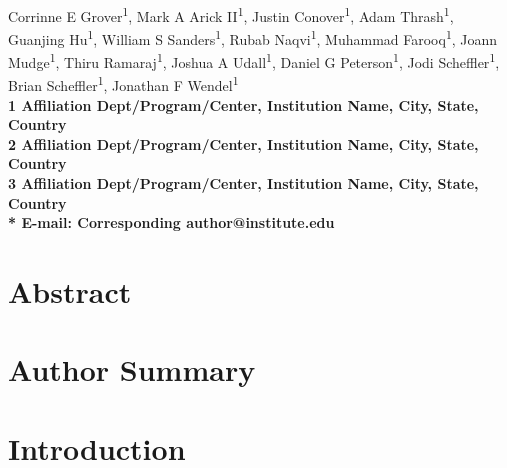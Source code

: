 \documentclass[10pt,letterpaper]{article}
\date{}
\begin{document}
\vspace*{0.35in}

\begin{flushleft}
{\Large
\textbf{}
}
\newline
\\
Corrinne E Grover\textsuperscript{1},
Mark A Arick II\textsuperscript{1},
Justin Conover\textsuperscript{1},
Adam Thrash\textsuperscript{1},
Guanjing Hu\textsuperscript{1},
William S Sanders\textsuperscript{1},
Rubab Naqvi\textsuperscript{1},
Muhammad Farooq\textsuperscript{1},
Joann Mudge\textsuperscript{1},
Thiru Ramaraj\textsuperscript{1},
Joshua A Udall\textsuperscript{1},
Daniel G Peterson\textsuperscript{1},
Jodi Scheffler\textsuperscript{1},
Brian Scheffler\textsuperscript{1},
Jonathan F Wendel\textsuperscript{1}
\\
\bf{1} Affiliation Dept/Program/Center, Institution Name, City, State, Country
\\
\bf{2} Affiliation Dept/Program/Center, Institution Name, City, State, Country
\\
\bf{3} Affiliation Dept/Program/Center, Institution Name, City, State, Country
\\

% 
%
* E-mail: Corresponding author@institute.edu
\end{flushleft}
\section*{Abstract}


\section*{Author Summary}


\linenumbers

\section*{Introduction}
\end{document}
